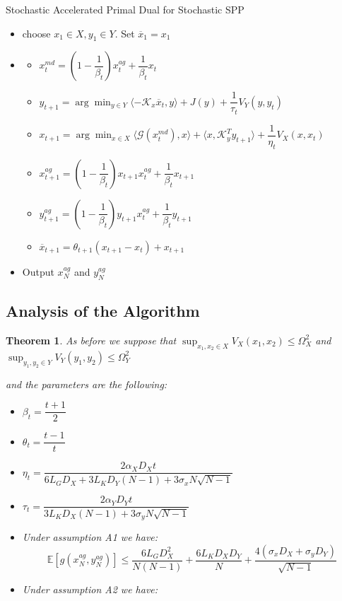 \documentclass[12pt,reqno]{amsart}
\newtheorem{thm}{Theorem}[section]
\numberwithin{equation}{section}
\begin{document}
Stochastic Accelerated Primal Dual for Stochastic SPP
\begin{itemize}
\item choose $x_{1} \in X, y_{1} \in Y$. Set $\overline{x}_{1} = x_{1}$
\item

\begin{itemize}
\item $x_{t}^{md} = (1 - \dfrac{1}{\beta_{t}})x_{t}^{ag} +  \dfrac{1}{\beta_{t}}x_{t}$
\item $y_{t+1} = \arg\min_{y \in Y} \langle -\mathcal{K}_{x}\overline{x}_{t},y\rangle + J(y) + \dfrac{1}{\tau_{t}}V_{Y}(y,y_{t})$
\item $x_{t+1} = \arg\min_{x \in X} \langle \mathcal{G}(x_{t}^{md}) ,x \rangle + \langle x,\mathcal{K}_{y}^{T}y_{t+1} \rangle + \dfrac{1}{\eta_{t}}V_{X}(x,x_{t})$
\item $x_{t+1}^{ag} = (1 -  \dfrac{1}{\beta_{t}})x_{t+1}x_{t}^{ag}+ \dfrac{1}{\beta_{t}}x_{t+1}$
\item $y_{t+1}^{ag} = (1 -  \dfrac{1}{\beta_{t}})y_{t+1}x_{t}^{ag}+ \dfrac{1}{\beta_{t}}y_{t+1}$
\item $\overline{x}_{t+1} = \theta_{t+1}(x_{t+1} - x_{t}) + x_{t+1}$
\end{itemize}

\item Output $x_{N}^{ag}$ and $y_{N}^{ag}$
\end{itemize}


\subsection{Analysis of the Algorithm}

\begin{thm}


As before we suppose that
 $\sup_{x_{1},x_{2} \in X} V_{X}(x_{1},x_{2}) \leq \Omega_{X}^{2}$ and 
$\sup_{y_{1},y_{2} \in Y} V_{Y}(y_{1},y_{2}) \leq \Omega_{Y}^{2}$

and the parameters are the following:

\begin{itemize}
\item $\beta_{t} = \dfrac{t+1}{2}$
\item $\theta_{t} = \dfrac{t-1}{t}$
\item $\eta_{t} = \dfrac{2\alpha_{X}D_{X}t}{6L_{G}D_{X} + 3L_{K}D_{Y}(N-1) + 3\sigma_{x}N\sqrt{N-1}}$
\item $\tau_{t} = \dfrac{2\alpha_{Y}D_{Y}t}{3L_{K}D_{X}(N-1) + 3\sigma_{y}N\sqrt{N-1}}$
\end{itemize}

\begin{itemize}
\item Under assumption A1 we have:
$$
\mathbb{E}[g(x_{N}^{ag},y_{N}^{ag})] \leq \dfrac{6L_{G}D_{X}^{2}}{N(N-1)} + \dfrac{6L_{K}D_{X}D_{Y}}{N} + \dfrac{4(\sigma_{x}D_{X} + \sigma_{y}D_{Y})}{\sqrt{N-1}} 
$$
\item Under assumption A2 we have:

\end{itemize}

\end{thm}
\end{document}
